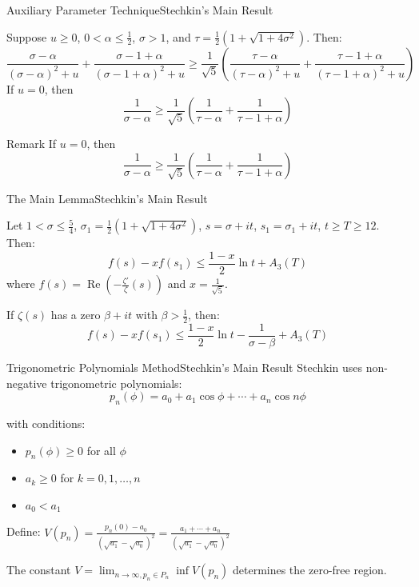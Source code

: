 \documentclass{beamer}
\def\Re{\operatorname{Re}}
\begin{document}
\begin{frame}{Auxiliary Parameter Technique}{Stechkin's Main Result}
\begin{lemma}
Suppose $u \geq 0$, $0 < \alpha \leq \frac{1}{2}$, $\sigma > 1$, and $\tau = \frac{1}{2}\left(1 + \sqrt{1 + 4\sigma^2}\right)$. Then:
\begingroup\small
\[
\frac{\sigma - \alpha}{(\sigma - \alpha)^2 + u} + \frac{\sigma - 1 + \alpha}{(\sigma - 1 + \alpha)^2 + u}
\geq \frac{1}{\sqrt{5}}\left(\frac{\tau - \alpha}{(\tau - \alpha)^2 + u} + \frac{\tau - 1 + \alpha}{(\tau - 1 + \alpha)^2 + u}\right)
\]
\endgroup
If $u =0$, then \[
\frac{1}{\sigma - \alpha} \geq \frac{1}{\sqrt{5}}\left(\frac{1}{\tau - \alpha} + \frac{1}{\tau - 1 + \alpha}\right)
\]
\end{lemma}

\vspace{0.3cm}

\begin{block}{Remark}
If $u =0$, then \[
\frac{1}{\sigma - \alpha} \geq \frac{1}{\sqrt{5}}\left(\frac{1}{\tau - \alpha} + \frac{1}{\tau - 1 + \alpha}\right)
\]
\end{block}
\end{frame}

\begin{frame}{The Main Lemma}{Stechkin's Main Result}
\begin{lemma}
Let $1 < \sigma \leq \frac{5}{4}$, $\sigma_1 = \frac{1}{2}\left(1 + \sqrt{1 + 4\sigma^2}\right)$, $s = \sigma + it$, $s_1 = \sigma_1 + it$, $t \geq T \geq 12$. Then:
$$f(s) - xf(s_1) \leq \frac{1-x}{2} \ln t + A_3(T)$$
where $f(s) = \Re\left(-\frac{\zeta'}{\zeta}(s)\right)$ and $x = \frac{1}{\sqrt{5}}$.

If $\zeta(s)$ has a zero $\beta + it$ with $\beta > \frac{1}{2}$, then:
$$f(s) - xf(s_1) \leq \frac{1-x}{2} \ln t - \frac{1}{\sigma - \beta} + A_3(T)$$
\end{lemma}
\end{frame}

\begin{frame}{Trigonometric Polynomials Method}{Stechkin's Main Result}
Stechkin uses non-negative trigonometric polynomials:
$$p_n(\phi) = a_0 + a_1 \cos \phi + \cdots + a_n \cos n\phi$$

with conditions:
\begin{itemize}
\item $p_n(\phi) \geq 0$ for all $\phi$
\item $a_k \geq 0$ for $k = 0, 1, \ldots, n$  
\item $a_0 < a_1$
\end{itemize}

\vspace{0.3cm}

Define: $V(p_n) = \frac{p_n(0) - a_0}{(\sqrt{a_1} - \sqrt{a_0})^2} = \frac{a_1 + \cdots + a_n}{(\sqrt{a_1} - \sqrt{a_0})^2}$

\vspace{0.3cm}

The constant $V = \lim_{n \to \infty, p_n \in P_n} \inf V(p_n)$ determines the zero-free region.



\end{frame}
\end{document}
